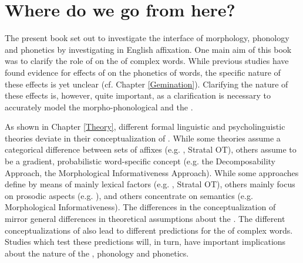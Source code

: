 \chapter{Where do we go from here?} \label{final conclusion}

The present book set out to investigate the interface of morphology, {phonology and phonetics} by investigating  in English {affixation}. 
One main aim of this book was to clarify the role of  on the  of complex words. 
While previous studies have found evidence for effects of  on the phonetics of words, the specific nature of these effects is yet unclear (cf. Chapter \ref{Gemination}). 
 Clarifying the nature of these effects is, however, quite important, as a clarification is necessary to accurately model the morpho-phonological and the . 

As shown in Chapter \ref{Theory}, different formal linguistic and psycholinguistic theories deviate in their conceptualization of  . While some theories assume a categorical difference between sets of affixes (e.g. , Stratal OT), others assume  to be a gradient, probabilistic word-specific concept (e.g. the Decomposability Approach, the Morphological Informativeness Approach). 
While some approaches define  by means of mainly lexical factors (e.g. , Stratal OT), others mainly focus on prosodic aspects (e.g. ), and others concentrate on semantics (e.g. Morphological Informativeness).  The differences in the conceptualization of  mirror general differences in theoretical assumptions about the . 
 The different conceptualizations of  also lead to different predictions for the  of complex words.
 Studies which test these predictions will, in turn, have important implications about the nature of the , phonology and phonetics.
 

